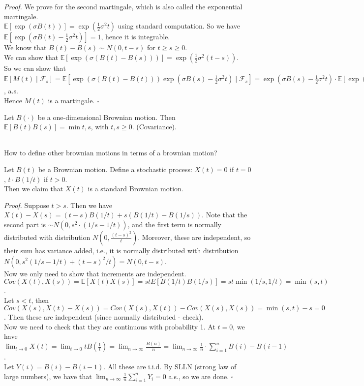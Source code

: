\documentclass[a4paper]{article}
\newenvironment{proof}{\begin{breakbox}\textit{Proof.}}{\hfill$\square$\end{breakbox}}
\newcommand{\nl}{\vspace{0.2cm}\\}
\newcommand{\F}{\mathcal{F}}
\newcommand{\E}{\mathbb{E}}
\begin{document}
\begin{proof}
    We prove for the second martingale, which is also called the exponential martingale.\nl
    $\E[\exp(\sigma B(t))] = \exp(\frac{1}{2}\sigma^2 t)$ using standard computation. So we have $\E[\exp(\sigma B(t) - \frac{1}{2}\sigma^2 t)] = 1$, hence it is integrable.\nl
    We know that $B(t) - B(s) \sim N(0, t - s)$ for $t \ge s \ge 0$.\nl
    We can show that
    $\E[\exp(\sigma (B(t) - B(s)))] = \exp(\frac{1}{2}\sigma^2(t-s))$.\nl
    So we can show that $\E[M(t) \mid \F_s] = \E[\exp(\sigma(B(t) - B(t)))\exp(\sigma B(s) - \frac{1}{2}\sigma^2 t) \mid \F_s] = \exp(\sigma B(s) - \frac{1}{2}\sigma^2 t) \cdot
    \E[\exp(\sigma(B(t) - B(s))) \mid \F_s] = \exp(\sigma B(s) - \frac{1}{2} \sigma^2 t) \cdot \E[\exp(\sigma(B(t) - B(s)))] = \exp(\sigma B(s) - \frac{1}{2} \sigma^2 t) \cdot \exp(\frac{1}{2}
    \sigma^2 (t - s)^2) = M(s)$, a.s.\nl
    Hence $M(t)$ is a martingale.
\end{proof}

\begin{lemma}
    Let $B(\cdot)$ be a one-dimensional Brownian motion. Then $\E[B(t) B(s)] = \min{t, s}$, with $t, s \ge 0$. (Covariance).
\end{lemma}
\nl
How to define other brownian motions in terms of a brownian motion?\nl

\begin{eg}
    Let $B(t)$ be a Brownian motion. Define a stochastic process:
    $X(t) = 0$ if $t = 0$, $t \cdot B(1/t)$ if $t > 0$.\nl
    Then we claim that $X(t)$ is a standard Brownian motion.
\end{eg}
\begin{proof}
    Suppose $t > s$. Then we have $X(t) - X(s) = (t - s)B(1/t) + s(B(1/t) - B(1/s))$. Note that the second part is $\sim N(0, s^2 \cdot \left(1/s - 1/t\right))$, and the first term is normally
    distributed with distribution $N(0, \frac{(t - s)^2}{t})$. Moreover, these are independent, so their sum has variance added, i.e., it is normally distributed with distribution $N(0, s^2(1/s - 1/t)
    + (t-s)^2/t) = N(0, t - s)$.\nl
    Now we only need to show that increments are independent.\nl
    $Cov(X(t), X(s)) = \E[X(t)X(s)] = stE[B(1/t)B(1/s)] = st \min(1/s, 1/t) = \min(s, t)$.\nl
    Let $s < t$, then $Cov(X(s), X(t) - X(s)) = Cov(X(s), X(t)) - Cov(X(s), X(s)) = \min(s, t) - s = 0$. Then these are independent (since normally distributed - check).\nl
    Now we need to check that they are continuous with probability 1. At $t = 0$, we have $\lim_{t \to 0} X(t) = \lim_{t \to 0} t B(\frac{1}{t}) = \lim_{n \to \infty} \frac{B(n)}{n} = \lim_{n
    \to \infty} \frac{1}{n} \cdot \sum_{i=1}^n B(i) - B(i - 1)$.\nl Let $Y(i) = B(i) - B(i - 1)$. All these are i.i.d.
    By SLLN (strong law of large numbers), we have that $\lim_{n \to \infty} \frac{1}{n} \sum_{i = 1}^n Y_i = 0$ a.s., so we are done.
\end{proof}
\end{document}
